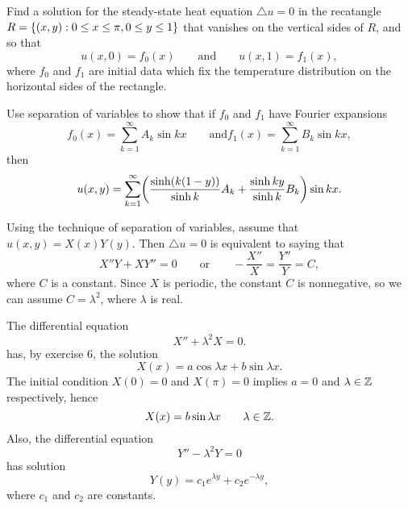 \begin{pb}[1]
    Find a solution for the steady-state heat equation \(\triangle u = 0\) in the recatangle
    \(R = \set{(x, y): 0 \leq x \leq \pi, 0 \leq y \leq 1}\) that vanishes
    on the vertical sides of \(R\),
    and so that
    \begin{equation*}
        u(x, 0) = f_0(x) \quad \quad \text{and} \quad \quad u(x, 1) = f_1(x),
    \end{equation*}
    where \(f_0\) and \(f_1\) are initial data which fix the temperature distribution on the horizontal
    sides of the rectangle.

    Use separation of variables to show that if \(f_0\) and \(f_1\) have Fourier expansions
    \begin{equation*}
        f_0(x) = \sum_{k = 1}^{\infty} A_k \sin kx \quad \quad \text{and}
        f_1(x) = \sum_{k = 1}^{\infty} B_k \sin kx,
    \end{equation*}
    then
    \begin{equation*}
        u(x, y)
        = \sum_{k = 1}^{\infty} \lrb{\frac{\sinh(k(1 - y))}{\sinh k} A_k + \frac{\sinh ky}{\sinh k}B_k} \sin kx.
    \end{equation*}

\begin{soln}
    Using the technique of separation of variables, assume that \(u(x, y) = X(x) Y(y)\).
    Then \(\triangle u = 0\) is equivalent to saying that
    \begin{equation*}
        X'' Y + X Y'' = 0
        \quad \quad \text{or} \quad \quad
        -\frac{X''}{X} = \frac{Y''}{Y} = C,
    \end{equation*}
    where \(C\) is a constant.
    Since \(X\) is periodic, the constant \(C\) is nonnegative,
    so we can assume \(C = \lambda^2\), where \(\lambda\) is real.

    The differential equation
    \begin{equation*}
        X'' + \lambda^2 X = 0.
    \end{equation*}
    has, by exercise 6, the solution
    \begin{equation*}
        X(x) = a \cos \lambda x + b \sin \lambda x.
    \end{equation*}
    The initial condition \(X(0) = 0\) and \(X(\pi) = 0\)
    implies \(a = 0\) and \(\lambda \in \mathbb{Z}\) respectively,
    hence
    \begin{equation*}
        X(x) = b \sin \lambda x \quad \quad \lambda \in \mathbb{Z}.
    \end{equation*}
    Also, the differential equation
    \begin{equation*}
        Y'' - \lambda^2 Y = 0
    \end{equation*}
    has solution
    \begin{equation*}
        Y(y) = c_1 e^{\lambda y} + c_2 e^{-\lambda y},
    \end{equation*}
    where \(c_1\) and \(c_2\) are constants.



\end{soln}
\end{pb}
